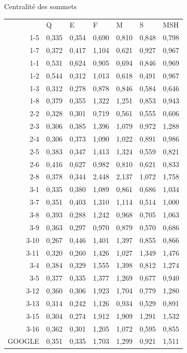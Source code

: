 \documentclass[a4paper]{article}
\begin{document}
\begin{center}
Centralité des sommets

\begin{tabular}{rllllll}
& Q & E & F & M & S & MSH\\
1-5&0,335 & 0,354 & 0,690 & 0,810 & 0,848 & 0,798\\
1-7&0,372 & 0,417 & 1,104 & 0,621 & 0,927 & 0,967\\
1-1&0,531 & 0,624 & 0,905 & 0,694 & 0,846 & 0,969\\
1-2&0,544 & 0,312 & 1,013 & 0,618 & 0,491 & 0,967\\
1-3&0,312 & 0,278 & 0,878 & 0,846 & 0,584 & 0,646\\
1-8&0,379 & 0,355 & 1,322 & 1,251 & 0,853 & 0,943\\
2-2&0,328 & 0,301 & 0,719 & 0,561 & 0,555 & 0,606\\
2-3&0,306 & 0,385 & 1,396 & 1,079 & 0,972 & 1,288\\
2-4&0,306 & 0,373 & 1,090 & 1,022 & 0,891 & 0,986\\
2-5&0,383 & 0,347 & 1,413 & 1,324 & 0,559 & 0,821\\
2-6&0,416 & 0,627 & 0,982 & 0,810 & 0,621 & 0,833\\
2-8&0,378 & 0,344 & 2,448 & 2,137 & 1,072 & 1,758\\
3-1&0,335 & 0,380 & 1,089 & 0,861 & 0,686 & 1,034\\
3-7&0,351 & 0,403 & 1,310 & 1,114 & 0,514 & 1,000\\
3-8&0,393 & 0,288 & 1,242 & 0,968 & 0,705 & 1,063\\
3-9&0,363 & 0,297 & 0,970 & 0,879 & 0,570 & 0,686\\
3-10&0,267 & 0,446 & 1,401 & 1,397 & 0,855 & 0,866\\
3-11&0,320 & 0,260 & 1,426 & 1,027 & 1,349 & 1,476\\
3-4&0,384 & 0,329 & 1,555 & 1,398 & 0,812 & 1,274\\
3-5&0,377 & 0,335 & 1,377 & 1,269 & 0,677 & 0,940\\
3-12&0,360 & 0,306 & 1,923 & 1,704 & 0,779 & 1,280\\
3-13&0,314 & 0,242 & 1,126 & 0,934 & 0,529 & 0,891\\
3-15&0,304 & 0,274 & 1,912 & 1,909 & 1,291 & 1,532\\
3-16&0,362 & 0,301 & 1,205 & 1,072 & 0,595 & 0,855\\
GOOGLE&0,351 & 0,335 & 1,703 & 1,299 & 0,921 & 1,511\\
\end{tabular}
\end{center}
\end{document}
